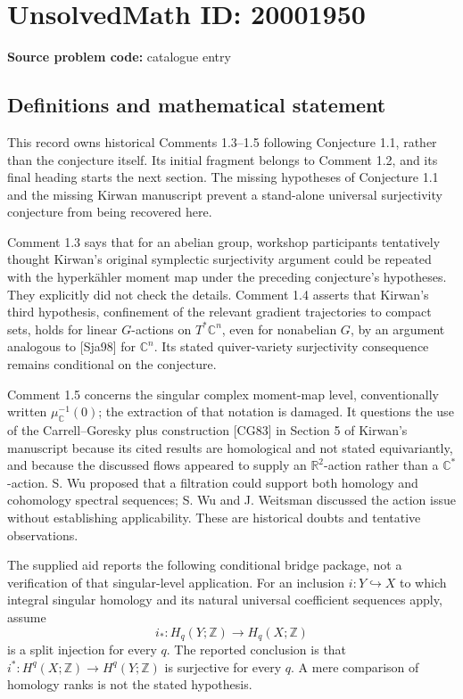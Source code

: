 \documentclass[11pt]{article}
\newcommand{\Z}{\mathbb{Z}}
\newcommand{\R}{\mathbb{R}}
\newcommand{\C}{\mathbb{C}}
\begin{document}
\section*{UnsolvedMath ID: 20001950}
\textbf{Source problem code:} catalogue entry
\subsection{Definitions and mathematical statement}
This record owns historical Comments 1.3--1.5 following Conjecture 1.1, rather than the conjecture itself. Its initial fragment belongs to Comment 1.2, and its final heading starts the next section. The missing hypotheses of Conjecture 1.1 and the missing Kirwan manuscript prevent a stand-alone universal surjectivity conjecture from being recovered here.

Comment 1.3 says that for an abelian group, workshop participants tentatively thought Kirwan's original symplectic surjectivity argument could be repeated with the hyperkähler moment map under the preceding conjecture's hypotheses. They explicitly did not check the details. Comment 1.4 asserts that Kirwan's third hypothesis, confinement of the relevant gradient trajectories to compact sets, holds for linear \(G\)-actions on \(T^*\C^n\), even for nonabelian \(G\), by an argument analogous to [Sja98] for \(\C^n\). Its stated quiver-variety surjectivity consequence remains conditional on the conjecture.

Comment 1.5 concerns the singular complex moment-map level, conventionally written \(\mu_{\C}^{-1}(0)\); the extraction of that notation is damaged. It questions the use of the Carrell--Goresky plus construction [CG83] in Section 5 of Kirwan's manuscript because its cited results are homological and not stated equivariantly, and because the discussed flows appeared to supply an \(\R^2\)-action rather than a \(\C^*\)-action. S. Wu proposed that a filtration could support both homology and cohomology spectral sequences; S. Wu and J. Weitsman discussed the action issue without establishing applicability. These are historical doubts and tentative observations.

The supplied aid reports the following conditional bridge package, not a verification of that singular-level application. For an inclusion \(i:Y\hookrightarrow X\) to which integral singular homology and its natural universal coefficient sequences apply, assume
\[
 i_*:H_q(Y;\Z)\longrightarrow H_q(X;\Z)
\]
is a split injection for every \(q\). The reported conclusion is that \(i^*:H^q(X;\Z)\to H^q(Y;\Z)\) is surjective for every \(q\). A mere comparison of homology ranks is not the stated hypothesis.
\end{document}
